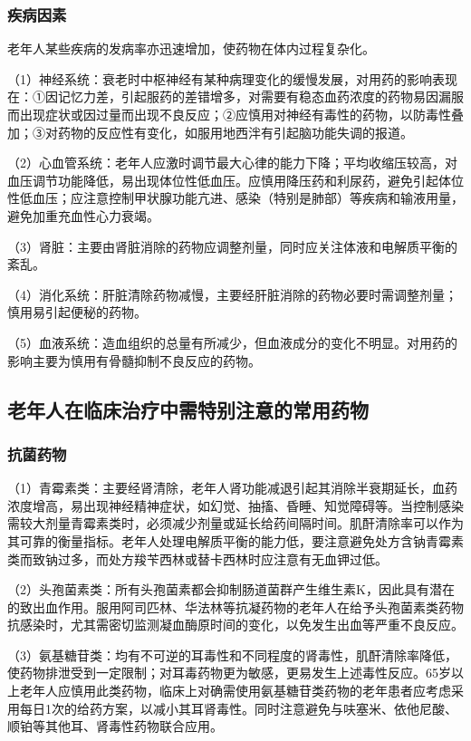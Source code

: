 \subsubsection{疾病因素}

老年人某些疾病的发病率亦迅速增加，使药物在体内过程复杂化。

（1）神经系统：衰老时中枢神经有某种病理变化的缓慢发展，对用药的影响表现在：①因记忆力差，引起服药的差错增多，对需要有稳态血药浓度的药物易因漏服而出现症状或因过量而出现不良反应；②应慎用对神经有毒性的药物，以防毒性叠加；③对药物的反应性有变化，如服用地西泮有引起脑功能失调的报道。

（2）心血管系统：老年人应激时调节最大心律的能力下降；平均收缩压较高，对血压调节功能降低，易出现体位性低血压。应慎用降压药和利尿药，避免引起体位性低血压；应注意控制甲状腺功能亢进、感染（特别是肺部）等疾病和输液用量，避免加重充血性心力衰竭。

（3）肾脏：主要由肾脏消除的药物应调整剂量，同时应关注体液和电解质平衡的紊乱。

（4）消化系统：肝脏清除药物减慢，主要经肝脏消除的药物必要时需调整剂量；慎用易引起便秘的药物。

（5）血液系统：造血组织的总量有所减少，但血液成分的变化不明显。对用药的影响主要为慎用有骨髓抑制不良反应的药物。

\subsection{老年人在临床治疗中需特别注意的常用药物}

\subsubsection{抗菌药物}

（1）青霉素类：主要经肾清除，老年人肾功能减退引起其消除半衰期延长，血药浓度增高，易出现神经精神症状，如幻觉、抽搐、昏睡、知觉障碍等。当控制感染需较大剂量青霉素类时，必须减少剂量或延长给药间隔时间。肌酐清除率可以作为其可靠的衡量指标。老年人处理电解质平衡的能力低，要注意避免处方含钠青霉素类而致钠过多，而处方羧苄西林或替卡西林时应注意有无血钾过低。

（2）头孢菌素类：所有头孢菌素都会抑制肠道菌群产生维生素K，因此具有潜在的致出血作用。服用阿司匹林、华法林等抗凝药物的老年人在给予头孢菌素类药物抗感染时，尤其需密切监测凝血酶原时间的变化，以免发生出血等严重不良反应。

（3）氨基糖苷类：均有不可逆的耳毒性和不同程度的肾毒性，肌酐清除率降低，使药物排泄受到一定限制；对耳毒药物更为敏感，更易发生上述毒性反应。65岁以上老年人应慎用此类药物，临床上对确需使用氨基糖苷类药物的老年患者应考虑采用每日1次的给药方案，以减小其耳肾毒性。同时注意避免与呋塞米、依他尼酸、顺铂等其他耳、肾毒性药物联合应用。

